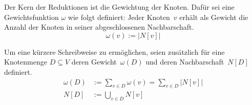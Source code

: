 %
%
%
%

Der Kern der Reduktionen ist die Gewichtung der Knoten. Dafür sei eine Gewichtsfunktion $\omega$ wie folgt definiert: Jeder Knoten~$v$ erhält als Gewicht die Anzahl der Knoten in seiner abgeschlossenen Nachbarschaft.
\[ \omega(v) := |N[v]| \]

 Um eine kürzere Schreibweise zu ermöglichen, seien zusätzlich für eine Knotenmenge $D \subseteq V$ deren Gewicht~$\omega(D)$ und deren Nachbarschaft~$N[D]$ definiert.
\begin{align*}
    \omega(D) &:= \sum_{v\in D}\omega(v) = \sum_{v\in D}|N[v]| \\
    N[D] &:= \bigcup_{v\in D}N[v]
\end{align*}

